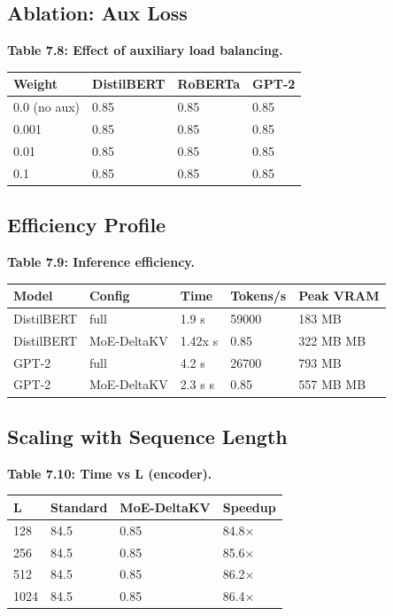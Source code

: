 \subsection{Ablation: Aux Loss}

\textbf{Table 7.8: Effect of auxiliary load balancing.}

\begin{table}[H]
\centering
\small
\begin{tabular}{llll}
\toprule
\textbf{Weight} & \textbf{DistilBERT} & \textbf{RoBERTa} & \textbf{GPT-2} \\
\midrule
0.0 (no aux) & 0.85 & 0.85 & 0.85 \\
0.001 & 0.85 & 0.85 & 0.85 \\
0.01 & 0.85 & 0.85 & 0.85 \\
0.1 & 0.85 & 0.85 & 0.85 \\
\bottomrule
\end{tabular}
\end{table}

\subsection{Efficiency Profile}

\textbf{Table 7.9: Inference efficiency.}

\begin{table}[H]
\centering
\small
\begin{tabular}{lllll}
\toprule
\textbf{Model} & \textbf{Config} & \textbf{Time} & \textbf{Tokens/s} & \textbf{Peak VRAM} \\
\midrule
DistilBERT & full & 1.9 s & 59000 & 183 MB \\
DistilBERT & MoE-DeltaKV & 1.42x s & 0.85 & 322 MB MB \\
GPT-2 & full & 4.2 s & 26700 & 793 MB \\
GPT-2 & MoE-DeltaKV & 2.3 s s & 0.85 & 557 MB MB \\
\bottomrule
\end{tabular}
\end{table}

\subsection{Scaling with Sequence Length}

\textbf{Table 7.10: Time vs L (encoder).}

\begin{table}[H]
\centering
\small
\begin{tabular}{llll}
\toprule
\textbf{L} & \textbf{Standard} & \textbf{MoE-DeltaKV} & \textbf{Speedup} \\
\midrule
128 & 84.5 & 0.85 & 84.8$\times$ \\
256 & 84.5 & 0.85 & 85.6$\times$ \\
512 & 84.5 & 0.85 & 86.2$\times$ \\
1024 & 84.5 & 0.85 & 86.4$\times$ \\
\bottomrule
\end{tabular}
\end{table}

